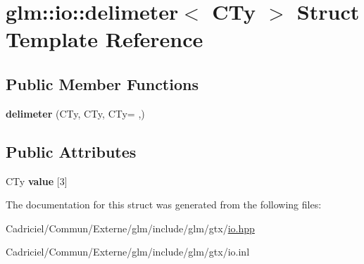 \hypertarget{structglm_1_1io_1_1delimeter}{}\section{glm\+:\+:io\+:\+:delimeter$<$ C\+Ty $>$ Struct Template Reference}
\label{structglm_1_1io_1_1delimeter}
\subsection*{Public Member Functions}
\begin{DoxyCompactItemize}
\item 
{\bfseries delimeter} (C\+Ty, C\+Ty, C\+Ty= \textquotesingle{},\textquotesingle{})\hypertarget{structglm_1_1io_1_1delimeter_acd4b6e1e816d423a069688c4772b9500}{}\label{structglm_1_1io_1_1delimeter_acd4b6e1e816d423a069688c4772b9500}

\end{DoxyCompactItemize}
\subsection*{Public Attributes}
\begin{DoxyCompactItemize}
\item 
C\+Ty {\bfseries value} \mbox{[}3\mbox{]}\hypertarget{structglm_1_1io_1_1delimeter_a9ade129dae50c4f716f724e7425f9c68}{}\label{structglm_1_1io_1_1delimeter_a9ade129dae50c4f716f724e7425f9c68}

\end{DoxyCompactItemize}


The documentation for this struct was generated from the following files\+:\begin{DoxyCompactItemize}
\item 
Cadriciel/\+Commun/\+Externe/glm/include/glm/gtx/\hyperlink{io_8hpp}{io.\+hpp}\item 
Cadriciel/\+Commun/\+Externe/glm/include/glm/gtx/io.\+inl\end{DoxyCompactItemize}
